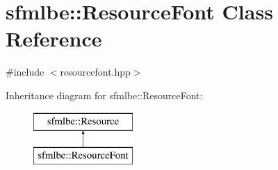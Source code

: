 \hypertarget{classsfmlbe_1_1_resource_font}{}\section{sfmlbe\+:\+:Resource\+Font Class Reference}
\label{classsfmlbe_1_1_resource_font}


{\ttfamily \#include $<$resourcefont.\+hpp$>$}

Inheritance diagram for sfmlbe\+:\+:Resource\+Font\+:\begin{figure}[H]
\begin{center}
\leavevmode
\includegraphics[height=2.000000cm]{classsfmlbe_1_1_resource_font}
\end{center}
\end{figure}
